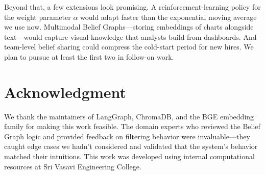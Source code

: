 \documentclass[conference]{IEEEtran}
\begin{document}
Beyond that, a few extensions look promising. A reinforcement-learning
policy for the weight parameter $\alpha$ would adapt faster than the
exponential moving average we use now. Multimodal Belief Graphs---storing
embeddings of charts alongside text---would capture visual knowledge that
analysts build from dashboards. And team-level belief sharing could
compress the cold-start period for new hires. We plan to pursue at least
the first two in follow-on work.

\section*{Acknowledgment}

We thank the maintainers of LangGraph, ChromaDB, and the BGE embedding
family for making this work feasible. The domain experts who reviewed
the Belief Graph logic and provided feedback on filtering behavior were
invaluable---they caught edge cases we hadn't considered and validated
that the system's behavior matched their intuitions. This work was
developed using internal computational resources at Sri Vasavi
Engineering College.
\end{document}
